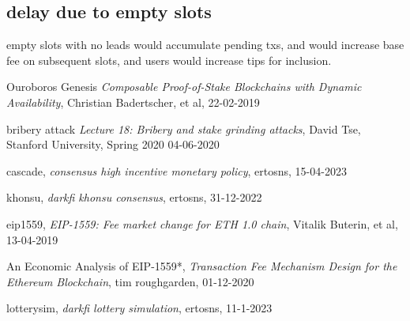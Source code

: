 \documentclass{article}
\begin{document}
\subsection{ delay due to empty slots}
 empty slots with no leads would accumulate pending txs, and would increase base fee on subsequent slots, and users would increase tips for inclusion.



\begin{thebibliography}{999}

  Ouroboros Genesis
  \emph{Composable Proof-of-Stake Blockchains with Dynamic Availability},
  Christian Badertscher, et al,
  22-02-2019

  bribery attack
  \emph{Lecture 18: Bribery and stake grinding attacks},
  David Tse,
  Stanford University, Spring 2020
  04-06-2020

  cascade,
  \emph{consensus high incentive monetary policy},
  ertosns,
  15-04-2023

  khonsu,
  \emph{darkfi khonsu consensus},
  ertosns,
  31-12-2022

  eip1559,
  \emph{EIP-1559: Fee market change for ETH 1.0 chain},
  Vitalik Buterin, et al,
  13-04-2019

  An Economic Analysis of EIP-1559*,
  \emph{Transaction Fee Mechanism Design for the Ethereum Blockchain},
  tim roughgarden,
  01-12-2020

  lotterysim,
  \emph{darkfi lottery simulation},
  ertosns,
  11-1-2023
\end{thebibliography}
\end{document}
